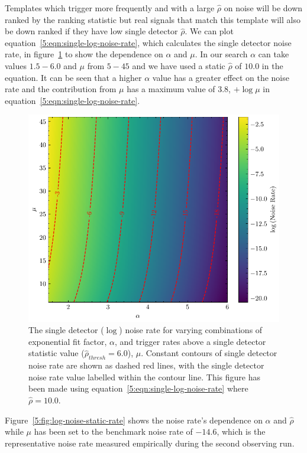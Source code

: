 Templates which trigger more frequently and with a large $\hat{\rho}$ on noise will be down ranked by the ranking statistic but real \gwadj signals that match this template will also be down ranked if they have low single detector $\hat{\rho}$. We can plot equation~\ref{5:eqn:single-log-noise-rate}, which calculates the single detector noise rate, in figure~\ref{5:fig:log-noise-static-snr} to show the dependence on $\alpha$ and $\mu$. In our search $\alpha$ can take values $1.5 - 6.0$ and $\mu$ from $5 - 45$ and we have used a static $\hat{\rho}$ of $10.0$ in the equation. It can be seen that a higher $\alpha$ value has a greater effect on the noise rate and the contribution from $\mu$ has a maximum value of $3.8$, $ + \log\mu$ in equation~\ref{5:eqn:single-log-noise-rate}.
%
\begin{figure}
    \centering
    \includegraphics[width=1\textwidth]{images/5_pycbclive/high-noise-rate/lognoise_alpha_rate.pdf}
    \caption{The single detector ($\log$) noise rate for varying combinations of exponential fit factor, $\alpha$, and trigger rates above a single detector statistic value ($\hat{\rho}_{thresh} = 6.0$), $\mu$. Constant contours of single detector noise rate are shown as dashed red lines, with the single detector noise rate value labelled within the contour line. This figure has been made using equation~\ref{5:eqn:single-log-noise-rate} where $\hat{\rho} = 10.0$.}
    \label{5:fig:log-noise-static-snr}
\end{figure}
%
Figure~\ref{5:fig:log-noise-static-rate} shows the noise rate's dependence on $\alpha$ and $\hat{\rho}$ while $\mu$ has been set to the benchmark noise rate of $-14.6$, which is the representative noise rate measured empirically during the second observing run. 
